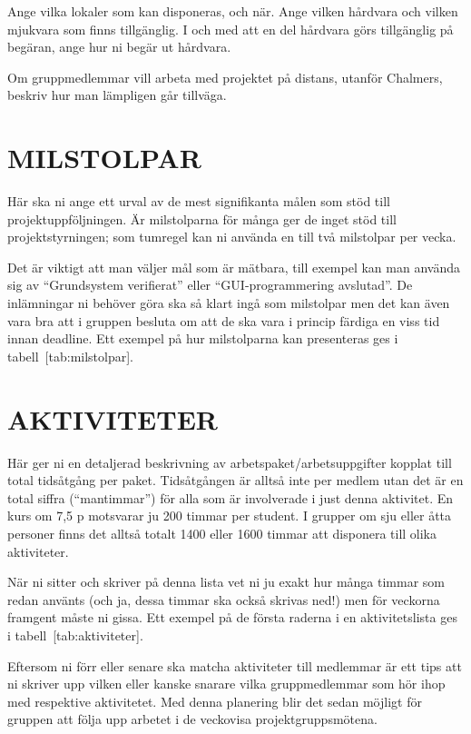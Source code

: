 \documentclass[a4paper]{article}
\begin{document}
Ange vilka lokaler som kan disponeras, och när. Ange vilken hårdvara och
vilken mjukvara som finns tillgänglig. I och med att en del hårdvara
görs tillgänglig på begäran, ange hur ni begär ut hårdvara.

Om gruppmedlemmar vill arbeta med projektet på distans, utanför
Chalmers, beskriv hur man lämpligen går tillväga.





\section{MILSTOLPAR}


Här ska ni ange ett urval av de mest signifikanta målen som stöd till
projektuppföljningen. Är milstolparna för många ger de inget stöd till
projektstyrningen; som tumregel kan ni använda en till två milstolpar
per vecka.

Det är viktigt att man väljer mål som är mätbara, till exempel kan man
använda sig av “Grundsystem verifierat” eller “GUI-programmering
avslutad”. De inlämningar ni behöver göra ska så klart ingå som
milstolpar men det kan även vara bra att i gruppen besluta om att de ska
vara i princip färdiga en viss tid innan deadline. Ett exempel på hur
milstolparna kan presenteras ges i tabell [tab:milstolpar].

\section{AKTIVITETER}


Här ger ni en detaljerad beskrivning av arbetspaket/arbetsuppgifter
kopplat till total tidsåtgång per paket. Tidsåtgången är alltså inte per
medlem utan det är en total siffra (“mantimmar”) för alla som är
involverade i just denna aktivitet. En kurs om 7,5 p motsvarar ju 200
timmar per student. I grupper om sju eller åtta personer finns det
alltså totalt 1400 eller 1600 timmar att disponera till olika
aktiviteter.

När ni sitter och skriver på denna lista vet ni ju exakt hur många
timmar som redan använts (och ja, dessa timmar ska också skrivas ned!)
men för veckorna framgent måste ni gissa. Ett exempel på de första
raderna i en aktivitetslista ges i tabell [tab:aktiviteter].

Eftersom ni förr eller senare ska matcha aktiviteter till medlemmar är
ett tips att ni skriver upp vilken eller kanske snarare vilka
gruppmedlemmar som hör ihop med respektive aktivitetet. Med denna
planering blir det sedan möjligt för gruppen att följa upp arbetet i de
veckovisa projektgruppsmötena.
\end{document}
